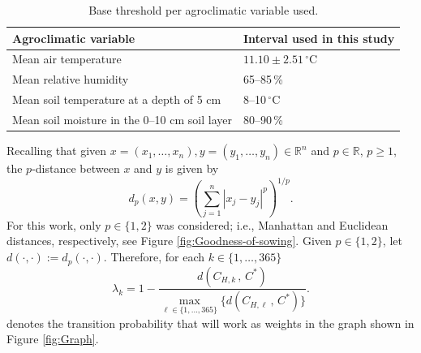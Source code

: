 \documentclass[isoft]{ssltexposter}
\begin{document}
\begin{poster}
\begin{centering}
	\begin{table}
		\centering
		\setlength{\tabcolsep}{20pt}
		\renewcommand{\arraystretch}{30}
		\begin{tabular}{ll}
			\toprule
			\textbf{Agroclimatic variable} & \textbf{Interval used in this study} \\
			\midrule
			Mean air temperature
			& $11.10 \pm 2.51\,^\circ\mathrm{C}$ \\
			Mean relative humidity
			& 65--85\,\% \\
			Mean soil temperature at a depth of 5 cm
			& 8--10\,$^\circ\mathrm{C}$ \\
			Mean soil moisture in the 0--10 cm soil layer
			& 80--90\,\% \\
			\bottomrule
		\end{tabular}
		\caption{Base threshold per agroclimatic variable used.}
		\label{tab:intervals_used}
	\end{table}
	\end{centering}

Recalling that given $x=(x_1,\ldots,x_n), y=(y_1,\ldots,y_n)\in \mathbb{R}^n$ and $p\in \mathbb{R}$, $p\geq1$, the $p$-distance between $x$ and $y$ is given by \begin{equation}
	d_p (x , y)= \left(\sum_{j=1}^n |x_j-y_j|^{p}\right)^{1/p}.
\end{equation}
For this work, only $p\in\{1,2\}$ was considered; i.e., Manhattan and Euclidean distances, respectively, see Figure \ref{fig:Goodness-of-sowing}. Given $p\in\{1,2\}$, let $d(\cdot , \cdot):= d_p (\cdot , \cdot)$. Therefore, for each $k\in\{1, \ldots, 365\}$ \begin{equation}
	\lambda_{k}= 1- \frac{d(C_{H,k} \,\mathbf{,}\, C^*)}{\displaystyle \max_{\ell\in \{1,\ldots, 365\}} \{d(C_{H,\ell}\, \mathbf{,} \,C^*)\}}.
\end{equation} denotes the transition probability that will work as weights in the graph shown in Figure \ref{fig:Graph}.





\begin{figure}
	\centering
	\hspace{-0.5cm}
\end{figure}
\end{poster}
\end{document}
